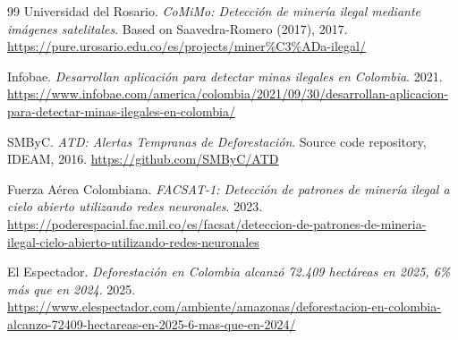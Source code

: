 \documentclass{article}
\begin{document}
\begin{thebibliography}{99}
Universidad del Rosario. \textit{CoMiMo: Detección de minería ilegal mediante
imágenes satelitales}. Based on Saavedra-Romero (2017), 2017.
\url{https://pure.urosario.edu.co/es/projects/miner\%C3\%ADa-ilegal/}

Infobae. \textit{Desarrollan aplicación para detectar minas ilegales en
Colombia}. 2021.
\url{https://www.infobae.com/america/colombia/2021/09/30/desarrollan-aplicacion-para-detectar-minas-ilegales-en-colombia/}

SMByC. \textit{ATD: Alertas Tempranas de Deforestación}. Source code repository,
IDEAM, 2016.
\url{https://github.com/SMByC/ATD}

Fuerza Aérea Colombiana. \textit{FACSAT-1: Detección de patrones de minería
ilegal a cielo abierto utilizando redes neuronales}. 2023.
\url{https://poderespacial.fac.mil.co/es/facsat/deteccion-de-patrones-de-mineria-ilegal-cielo-abierto-utilizando-redes-neuronales}

El Espectador. \textit{Deforestación en Colombia alcanzó 72.409 hectáreas en
2025, 6\% más que en 2024}. 2025.
\url{https://www.elespectador.com/ambiente/amazonas/deforestacion-en-colombia-alcanzo-72409-hectareas-en-2025-6-mas-que-en-2024/}

\end{thebibliography}
\end{document}
